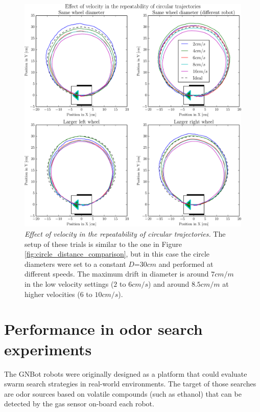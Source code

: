 \documentclass[12pt,twoside]{report}
\begin{document}
\begin{figure}[hbtp]
\centerline{\includegraphics[width=1\linewidth]{circle_velocity_comparison}}
\caption[Effect of velocity in the repeatability of circular trajectories]{\emph{Effect of velocity in the repeatability of circular trajectories.}
The setup of these trials is similar to the one in Figure \ref{fig:circle_distance_comparison}, but in this case the circle diameters were set to a constant $D$=$30cm$ and performed at different speeds.
The maximum drift in diameter is around $7cm/m$ in the low velocity settings ($2$ to $6cm/s$) and around $8.5cm/m$ at higher velocities ($6$ to $10cm/s$).
}
\label{fig:circle_velocity_comparison}
\end{figure}










\newpage
\section{Performance in odor search experiments}

The GNBot robots were originally designed as a platform that could evaluate swarm search strategies in real-world environments\cite{GarciaSauraLM14,GarciaSaura14}. The target of those searches are odor sources based on volatile compounds (such as ethanol) that can be detected by the gas sensor on-board each robot.
\end{document}
